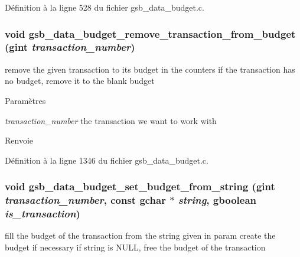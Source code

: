 Définition à la ligne 528 du fichier gsb\_\-data\_\-budget.c.

\subsubsection[{gsb\_\-data\_\-budget\_\-remove\_\-transaction\_\-from\_\-budget}]{\setlength{\rightskip}{0pt plus 5cm}void gsb\_\-data\_\-budget\_\-remove\_\-transaction\_\-from\_\-budget (gint {\em transaction\_\-number})}\label{gsb__data__budget_8c_ab85a062bae73070637c4ff986150de7a}
remove the given transaction to its budget in the counters if the transaction has no budget, remove it to the blank budget


\begin{DoxyParams}{Paramètres}
\item[{\em transaction\_\-number}]the transaction we want to work with\end{DoxyParams}
\begin{DoxyReturn}{Renvoie}

\end{DoxyReturn}


Définition à la ligne 1346 du fichier gsb\_\-data\_\-budget.c.

\subsubsection[{gsb\_\-data\_\-budget\_\-set\_\-budget\_\-from\_\-string}]{\setlength{\rightskip}{0pt plus 5cm}void gsb\_\-data\_\-budget\_\-set\_\-budget\_\-from\_\-string (gint {\em transaction\_\-number}, \/  const gchar $\ast$ {\em string}, \/  gboolean {\em is\_\-transaction})}\label{gsb__data__budget_8c_a431971c9da52046a65f3f00c88d7f58b}
fill the budget of the transaction from the string given in param create the budget if necessary if string is NULL, free the budget of the transaction


